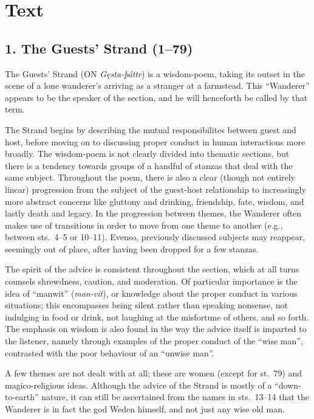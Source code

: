 \section{Text}

\subsection{1. The Guests’ Strand (1--79)}

The Guests’ Strand (ON \emph{Gęsta-þáttr}) is a wisdom-poem, taking its outset in the scene of a lone wanderer’s arriving as a stranger at a farmstead.  This “Wanderer” appears to be the speaker of the section, and he will henceforth be called by that term.

The Strand begins by describing the mutual responsibilites between guest and host, before moving on to discussing proper conduct in human interactions more broadly.  The wisdom-poem is not clearly divided into thematic sections, but there is a tendency towards groups of a handful of stanzas that deal with the same subject.  Throughout the poem, there is also a clear (though not entirely linear) progression from the subject of the guest-host relationship to increasingly more abstract concerns like gluttony and drinking, friendship, fate, wisdom, and lastly death and legacy.
In the progression between themes, the Wanderer often makes use of transitions in order to move from one theme to another (e.g., between sts.~4--5 or 10--11).  Evenso, previously discussed subjects may reappear, seemingly out of place, after having been dropped for a few stanzas.

The spirit of the advice is consistent throughout the section, which at all turns counsels shrewdness, caution, and moderation.  Of particular importance is the idea of “manwit” (\emph{man-vit}), or knowledge about the proper conduct in various situations; this encompasses being silent rather than speaking nonsense, not indulging in food or drink, not laughing at the misfortune of others, and so forth.  The emphasis on wisdom is also found in the way the advice itself is imparted to the listener, namely through examples of the proper conduct of the “wise man”, contrasted with the poor behaviour of an “unwise man”.

A few themes are not dealt with at all; these are women (except for st.~79) and magico-religious ideas.  Although the advice of the Strand is mostly of a “down-to-earth” nature, it can still be ascertained from the names in sts.~13--14 that the Wanderer is in fact the god Weden himself, and not just any wise old man.

